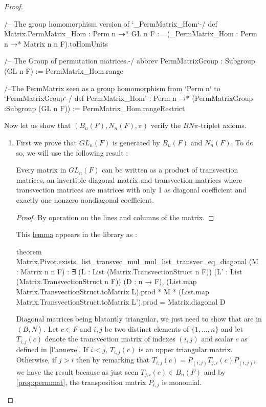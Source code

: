 \begin{proof}
\begin{leancode}
/-- The group homomorphism version of `_PermMatrix_Hom`-/
def Matrix.PermMatrix_Hom : Perm n →* GL n F :=
  (_PermMatrix_Hom : Perm n →* Matrix n n F).toHomUnits

/-- The Group of permutation matrices.-/
abbrev PermMatrixGroup : Subgroup (GL n F) := PermMatrix_Hom.range

/--The PermMatrix seen as a group homomorphism from `Perm n` to `PermMatrixGroup`-/
def PermMatrix_Hom' : Perm n →* (PermMatrixGroup :Subgroup (GL n F)) :=
  PermMatrix_Hom.rangeRestrict

\end{leancode}

Now let us show that $\left( B_n(F),N_n(F), \pi \right)$ verify the $BN\pi$-triplet axioms.

\begin{enumerate}
    \item \label{GL1} First we prove that $GL_n\left( F \right)$ is generated by $B_{n}\left( F \right)$ and $N_n\left( F \right)$. To do so, we will use the following result :

\begin{lemme} \label{lem:trans}
    Every matrix in $GL_n\left( F \right)$ can be written as a product of transvection matrices, an invertible diagonal matrix and transvection matrices where transvection matrices are matrices with only 1 as diagonal coefficient and exactly one nonzero nondiagonal coefficient.
\end{lemme}
\begin{proof}
By operation on the lines and columns of the matrix.
\end{proof}

This \href{https://leanprover-community.github.io/mathlib4_docs/Mathlib/LinearAlgebra/Matrix/Transvection.html#Matrix.Pivot.exists_list_transvec_mul_mul_list_transvec_eq_diagonal}{lemma} appears in the \Mathlib library as :
\begin{leancode}
theorem Matrix.Pivot.exists_list_transvec_mul_mul_list_transvec_eq_diagonal 
  (M : Matrix n n F) : ∃ (L : List (Matrix.TransvectionStruct n F)) 
    (L' : List (Matrix.TransvectionStruct n F)) (D : n → F), 
      (List.map Matrix.TransvectionStruct.toMatrix L).prod * M * 
         (List.map Matrix.TransvectionStruct.toMatrix L').prod = Matrix.diagonal D
\end{leancode}

Diagonal matrices being blatantly triangular, we just need to show that  are in $\left<B,N \right>$. Let $c \in F$ and $i,j$ be two distinct elements of $\{ 1,\ldots,n\}$ and let $T_{i,j}\left( c \right)$ denote the transvection matrix of indexes $\left( i,j \right)$ and scalar $c$ as defined in \ref{l'annexe}. If $i<j$, $T_{i,j}\left( c \right)$ is an upper triangular matrix. Otherwise, if $j>i$ then by remarking that $T_{i,j}(c) = P_{\left( i,j \right)} T_{j,i}\left( c \right) P_{\left( i,j \right)}$, we have the result because as just seen $T_{j,i}\left( c \right) \in B_n\left( F \right)$ and by \ref{prop:permmat}, the transposition matrix $P_{i,j}$ is monomial.


\end{enumerate}
\end{proof}
